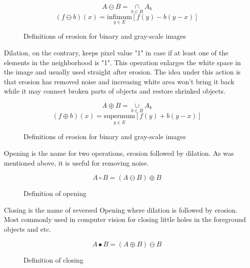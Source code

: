 \documentclass[../../../../main]{subfiles}
\begin{document}
\begin{figure} [!ht]
  \centering    
    \begin{equation}
        A \ominus B = \underset{b\in B}{\cap} A_b
    \end{equation}
    \begin{equation}
       (f \ominus b)(x) = \underset{y\in E}{\text{infimum}}[f(y)-b(y-x)]
    \end{equation}
  \caption{Definitions of erosion for binary and gray-scale images}
\end{figure}

Dilation, on the contrary, keeps pixel value "1" in case if at least one of the elements in the neighborhood is "1". This operation enlarges the white space in the image and usually used straight after erosion. The idea under this action is that erosion has removed noise and increasing white area won't bring it back while it may connect broken parts of objects and restore shrinked objects. 

\begin{figure} [!ht]
  \centering    
    \begin{equation}
        A \oplus B = \underset{b\in B}{\cup} A_b
    \end{equation}
    \begin{equation}
       (f \oplus b)(x) = \underset{y\in E}{\text{supermum}}[f(y)+b(y-x)]
    \end{equation}
  \caption{Definitions of erosion for binary and gray-scale images}
\end{figure}

Opening is the name for two operations, erosion followed by dilation. As was mentioned above, it is useful for removing noise.

\begin{figure} [!ht]
  \centering    
    \begin{equation}
        A \circ B = (A \ominus B) \oplus B
    \end{equation}
  \caption{Definition of opening}
\end{figure}

Closing is the name of reversed Opening where dilation is followed by erosion. Most commonly used in computer vision for closing little holes in the foreground objects and etc.

\begin{figure} [!ht]
  \centering    
    \begin{equation}
        A \bullet B = (A \oplus B) \ominus B
    \end{equation}
  \caption{Definition of closing}
\end{figure}
\end{document}
